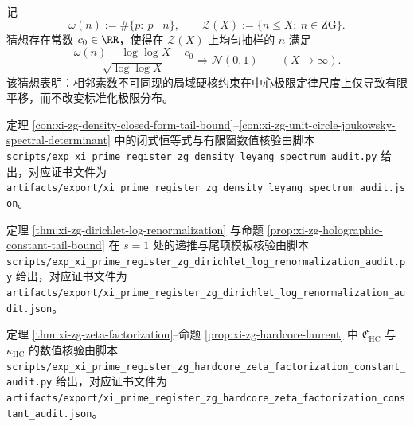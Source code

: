 \begin{conjecture}\label{conj:xi-zg-erdos-kac-under-local-hardcore}
记
\[
\omega(n):=\#\{p:\ p\mid n\},
\qquad
\mathcal Z(X):=\{n\le X:\ n\in\mathrm{ZG}\}.
\]
猜想存在常数 \(c_0\in\RR\)，使得在 \(\mathcal Z(X)\) 上均匀抽样的 \(n\) 满足
\[
\frac{\omega(n)-\log\log X-c_0}{\sqrt{\log\log X}}
\Longrightarrow
\mathcal N(0,1)
\qquad(X\to\infty).
\]
该猜想表明：相邻素数不可同现的局域硬核约束在中心极限定律尺度上仅导致有限平移，而不改变标准化极限分布。
\end{conjecture}

\begin{remark}[可复现核验脚本]\label{rem:xi-zg-density-leyang-spectral-audit-script}
定理 \ref{con:xi-zg-density-closed-form-tail-bound}--\ref{con:xi-zg-unit-circle-joukowsky-spectral-determinant}
中的闭式恒等式与有限窗数值核验由脚本
\texttt{scripts/exp\_xi\_prime\_register\_zg\_density\_leyang\_spectrum\_audit.py}
给出，对应证书文件为
\texttt{artifacts/export/xi\_prime\_register\_zg\_density\_leyang\_spectrum\_audit.json}。
\par
定理 \ref{thm:xi-zg-dirichlet-log-renormalization} 与命题 \ref{prop:xi-zg-holographic-constant-tail-bound}
在 \(s=1\) 处的递推与尾项模板核验由脚本
\texttt{scripts/exp\_xi\_prime\_register\_zg\_dirichlet\_log\_renormalization\_audit.py}
给出，对应证书文件为
\texttt{artifacts/export/xi\_prime\_register\_zg\_dirichlet\_log\_renormalization\_audit.json}。
\par
定理 \ref{thm:xi-zg-zeta-factorization}--命题 \ref{prop:xi-zg-hardcore-laurent}
中 \(\mathfrak C_{\mathrm{HC}}\) 与 \(\kappa_{\mathrm{HC}}\) 的数值核验由脚本
\texttt{scripts/exp\_xi\_prime\_register\_zg\_hardcore\_zeta\_factorization\_constant\_audit.py}
给出，对应证书文件为
\texttt{artifacts/export/xi\_prime\_register\_zg\_hardcore\_zeta\_factorization\_constant\_audit.json}。
\end{remark}

